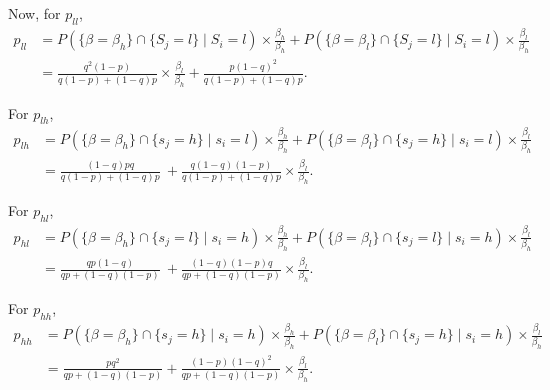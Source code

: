 \documentclass[12pt]{article}
\begin{document}
Now, for \( p_{ll} \),
\begin{align*}
p_{ll} &= P\left( \{\beta = \beta_h\} \cap \{S_j = l\} \mid S_i = l \right) \times \frac{\beta_h}{\beta_h}
+ P\left( \{\beta = \beta_l\} \cap \{S_j = l\} \mid S_i = l \right) \times \frac{\beta_l}{\beta_h} \\
&= \frac{q^2(1-p)} {q(1-p)+(1-q)p}\times \frac{\beta_l}{\beta_h}
+ \frac{p(1-q)^2}{q(1-p)+(1-q)p}.
\end{align*}

For \( p_{lh} \),
\begin{align*}
p_{lh} &= P\left( \{\beta = \beta_h\} \cap \{s_j = h\} \mid s_i = l \right) \times \frac{\beta_h}{\beta_h}
+ P\left( \{\beta = \beta_l\} \cap \{s_j = h\} \mid s_i = l \right) \times \frac{\beta_l}{\beta_h}\\
&= \frac{(1-q)pq}{q(1-p) + (1-q)p}\
+ \frac{q(1-q)(1-p)}{q(1-p) + (1-q)p} \times \frac{\beta_l}{\beta_h}.
\end{align*}

For \( p_{hl} \),
\begin{align*}
  p_{hl} &= P\left( \{\beta = \beta_h\} \cap \{s_j = l\} \mid s_i = h \right) \times \frac{\beta_h}{\beta_h}
+ P\left( \{\beta = \beta_l\} \cap \{s_j = l\} \mid s_i = h \right) \times \frac{\beta_l}{\beta_h} \\
&= \frac{qp(1-q)}{qp + (1-q)(1-p)} \
+ \frac{(1-q)(1-p)q}{qp + (1-q)(1-p)} \times \frac{\beta_l}{\beta_h}.
\end{align*}

For \( p_{hh} \),
\begin{align*}
p_{hh} &= P\left( \{\beta = \beta_h\} \cap \{s_j = h\} \mid s_i = h \right) \times \frac{\beta_h}{\beta_h}
+ P\left( \{\beta = \beta_l\} \cap \{s_j = h\} \mid s_i = h \right) \times \frac{\beta_l}{\beta_h} \\
&= \frac{pq^2}{qp + (1-q)(1-p)}
+ \frac{(1-p)(1-q)^2}{qp + (1-q)(1-p)} \times \frac{\beta_l}{\beta_h}.
\end{align*}
\end{document}
